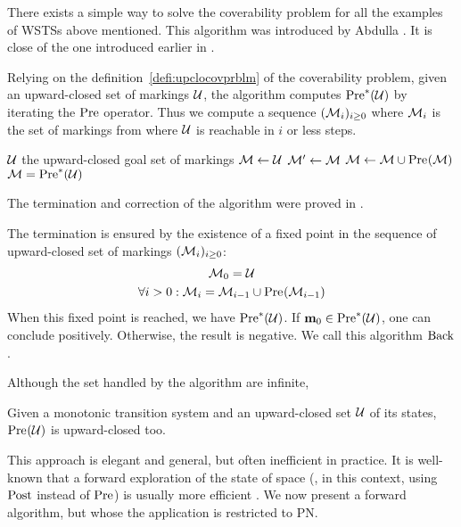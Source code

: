 There exists a simple way to solve the coverability problem for all the examples of \acp{WSTS} above mentioned.
This algorithm was introduced by Abdulla  \citep{Abdulla96}.
It is close of the one introduced earlier in \cite{Finkel90}.

Relying on the definition~\ref{defi:upclocovprblm} of the coverability problem, given an upward-closed set of markings $\mathcal{U}$, the algorithm computes $\operatorname{Pre}^*_{}(\mathcal{U})$ by iterating the $\operatorname{Pre}$ operator.
Thus we compute a sequence $(\mathcal{M}_i)_{i \geq 0}$ where $\mathcal{M}_i$ is the set of markings from where $\mathcal{U}$ is reachable in $i$ or less steps.


\begin{algorithm}
  \caption{$\back$}
  \label{algo:back}

  \begin{algorithmic}
    \Require $\mathcal{U}$ the upward-closed goal set of markings
    \State $\mathcal{M} \gets \mathcal{U}$
    \Repeat
      \State $\mathcal{M}'\gets \mathcal{M}$
      \State $\mathcal{M} \gets \mathcal{M} \cup \operatorname{Pre}_{}(\mathcal{M})$
    \Ensure $\mathcal{M} = \operatorname{Pre}^*_{}(\mathcal{U})$
  \end{algorithmic}
\end{algorithm}


The termination and correction of the algorithm were proved in \cite{Abdulla96}.%

The termination is ensured by the existence of a fixed point in the sequence of upward-closed set of markings $(\mathcal{M}_i)_{i \geq 0}$:
\begin{gather*}
  \mathcal{M}_0 = \mathcal{U} \\
  \forall i > 0 : \mathcal{M}_i = \mathcal{M}_{i-1} \cup \operatorname{Pre}_{}(\mathcal{M}_{i-1})
\end{gather*}
When this fixed point is reached, we have $\operatorname{Pre}^*_{}(\mathcal{U})$.
If $\mathbf{m}_0 \in \operatorname{Pre}^*_{}(\mathcal{U})$, one can conclude positively.
Otherwise, the result is negative.
We call this algorithm $\back$.

Although the set handled by the algorithm are infinite, 

\begin{lemm}
  Given a monotonic transition system and an upward-closed set $\mathcal{U}$ of its states, $\operatorname{Pre}_{}(\mathcal{U})$ is upward-closed too.
\end{lemm}

This approach is elegant and general, but often inefficient in practice.
It is well-known that a forward exploration of the state of space (, in this context, using $\operatorname{Post}$ instead of $\operatorname{Pre}$) is usually more efficient \citep{Henzinger98}.
We now present a forward algorithm, but whose the application is restricted to \ac{PN}.
